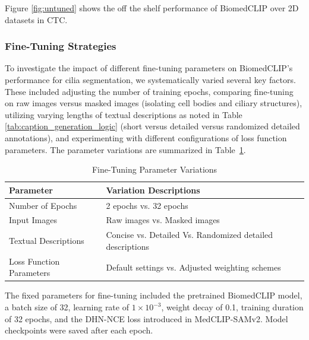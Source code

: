 \documentclass[./dissertation.tex]{subfiles}
\begin{document}
Figure \ref{fig:untuned} shows the off the shelf performance of BiomedCLIP over 2D datasets in CTC.


\subsubsection{Fine-Tuning Strategies}



To investigate the impact of different fine-tuning parameters on BiomedCLIP's performance for cilia segmentation, we systematically varied several key factors. These included adjusting the number of training epochs, comparing fine-tuning on raw images versus masked images (isolating cell bodies and ciliary structures), utilizing varying lengths of textual descriptions as noted in Table \ref{tab:caption_generation_logic} (short versus detailed versus randomized detailed annotations), and experimenting with different configurations of loss function parameters. The parameter variations are summarized in Table~\ref{tab:fine-tune-params}.

\begin{table}[ht]
    \caption{Fine-Tuning Parameter Variations}
    \centering
    \label{tab:fine-tune-params}
    \begin{tabular}{|l|l|}
        \hline
        \textbf{Parameter}       & \textbf{Variation Descriptions}                           \\  \hline
        Number of Epochs         & 2 epochs vs. 32 epochs                                    \\ \hline
        Input Images             & Raw images vs. Masked images                              \\ \hline
        Textual Descriptions     & Concise vs. Detailed Vs. Randomized detailed descriptions \\ \hline
        Loss Function Parameters & Default settings vs. Adjusted weighting schemes           \\ \hline
    \end{tabular}
\end{table}
The fixed parameters for fine-tuning included the pretrained BiomedCLIP model, a batch size of 32, learning rate of \(1\times10^{-3}\), weight decay of 0.1, training duration of 32 epochs, and the DHN-NCE loss introduced in MedCLIP-SAMv2. Model checkpoints were saved after each epoch.
\end{document}
